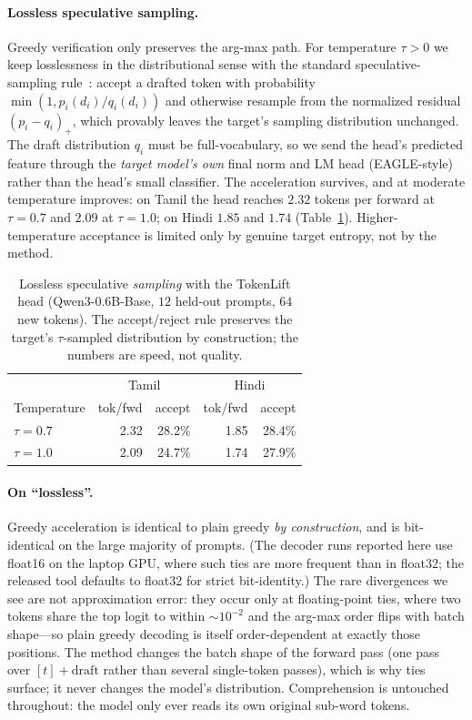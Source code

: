 \paragraph{Lossless speculative sampling.} Greedy verification only preserves the
arg-max path. For temperature $\tau>0$ we keep losslessness in the distributional
sense with the standard speculative-sampling rule~\citep{leviathan2023fast,
chen2023accelerating}: accept a drafted token with probability
$\min(1, p_i(d_i)/q_i(d_i))$ and otherwise resample from the normalized residual
$(p_i-q_i)_+$, which provably leaves the target's sampling distribution
unchanged. The draft distribution $q_i$ must be full-vocabulary, so we send the
head's predicted feature through the \emph{target model's own} final norm and LM
head (EAGLE-style) rather than the head's small classifier. The acceleration
survives, and at moderate temperature improves: on Tamil the head reaches
$2.32$ tokens per forward at $\tau{=}0.7$ and $2.09$ at $\tau{=}1.0$; on Hindi
$1.85$ and $1.74$ (Table~\ref{tab:sampling}). Higher-temperature acceptance is
limited only by genuine target entropy, not by the method.

\begin{table}[t]
\centering\small
\begin{tabular}{lrrrr}
\toprule
 & \multicolumn{2}{c}{Tamil} & \multicolumn{2}{c}{Hindi} \\
Temperature & tok/fwd & accept & tok/fwd & accept \\
\midrule
$\tau=0.7$ & 2.32 & 28.2\% & 1.85 & 28.4\% \\
$\tau=1.0$ & 2.09 & 24.7\% & 1.74 & 27.9\% \\
\bottomrule
\end{tabular}
\caption{Lossless speculative \emph{sampling} with the TokenLift head
(Qwen3-0.6B-Base, $12$ held-out prompts, $64$ new tokens). The accept/reject
rule preserves the target's $\tau$-sampled distribution by construction; the
numbers are speed, not quality.}
\label{tab:sampling}
\end{table}

\paragraph{On ``lossless''.} Greedy acceleration is identical to plain greedy
\emph{by construction}, and is bit-identical on the large majority of prompts.
(The decoder runs reported here use float16 on the laptop GPU, where such ties
are more frequent than in float32; the released tool defaults to float32 for
strict bit-identity.)
The rare divergences we see are not approximation error: they occur only at
floating-point ties, where two tokens share the top logit to within
$\sim\!10^{-2}$ and the arg-max order flips with batch shape---so plain greedy
decoding is itself order-dependent at exactly those positions. The method
changes the batch shape of the forward pass (one pass over $[t]+\text{draft}$
rather than several single-token passes), which is why ties surface; it never
changes the model's distribution. Comprehension is untouched throughout: the
model only ever reads its own original sub-word tokens.

